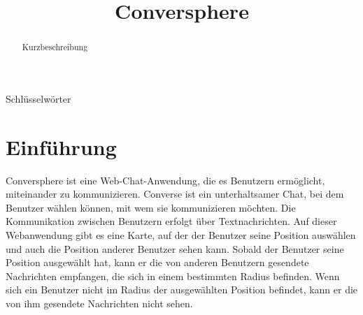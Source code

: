 \documentclass[conference]{IEEEtran}
\begin{document}
	\title{Conversphere}
	\author{
		\and
		\and
		\and
		\and
	}

	\maketitle

	\begin{abstract}
		Kurzbeschreibung
	\end{abstract}

	\begin{IEEEkeywords}
		Schlüsselwörter
	\end{IEEEkeywords}

	\section{Einführung}
	Conversphere ist eine Web-Chat-Anwendung, die es Benutzern ermöglicht, miteinander zu kommunizieren. Converse ist ein unterhaltsamer Chat, bei dem Benutzer wählen können, mit wem sie kommunizieren möchten. Die Kommunikation zwischen Benutzern erfolgt über Textnachrichten. Auf dieser Webanwendung gibt es eine Karte, auf der der Benutzer seine Position auswählen und auch die Position anderer Benutzer sehen kann. Sobald der Benutzer seine Position ausgewählt hat, kann er die von anderen Benutzern gesendete Nachrichten empfangen, die sich in einem bestimmten Radius befinden. Wenn sich ein Benutzer nicht im Radius der ausgewählten Position befindet, kann er die von ihm gesendete Nachrichten nicht sehen.
	
\end{document}

